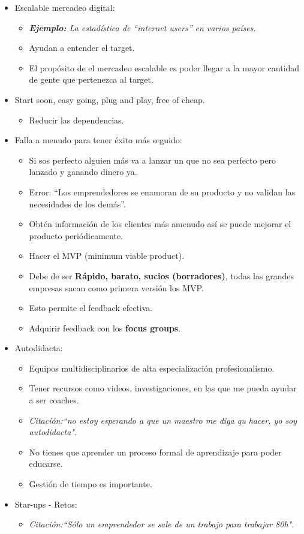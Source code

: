 \begin{itemize}
    \item Escalable mercadeo digital:
        \begin{itemize}
            \item \emph{\textbf{Ejemplo: }La estadística de ``internet users'' en varios países. } 
            \item Ayudan a entender el target.
            \item El propósito de el mercadeo escalable es poder llegar a la mayor cantidad de gente que pertenezca al target.
        \end{itemize}
    
    \item Start soon, easy going, plug and play, free of cheap.
        \begin{itemize}
            \item Reducir las dependencias.
        \end{itemize}
    
    \item Falla a menudo para tener éxito más seguido:
        \begin{itemize}
            \item Si sos perfecto alguien más va a lanzar un que no sea perfecto pero lanzado y ganando dinero ya.
            \item Error: ``Los emprendedores se enamoran de su producto y no validan las necesidades de los demás''.
            \item Obtén información de los clientes más amenudo así se puede mejorar el producto periódicamente.
            \item Hacer el MVP (minimum viable product).
            \item Debe de ser \textbf{Rápido, barato, sucios (borradores)}, todas las grandes empresas sacan como primera versión los MVP.
            \item Esto permite el feedback efectiva. 
            \item Adquirir feedback con los \textbf{focus groups}.
        \end{itemize}
    
    \item Autodidacta:
        \begin{itemize}
            \item Equipos multidisciplinarios de alta especialización profesionalismo.
            \item Tener recursos como videos, investigaciones, en las que me pueda ayudar a ser coaches.
            \item \emph{Citación:``no estoy esperando a que un maestro me diga qu hacer, yo soy autodidacta"}.
            \item No tienes que aprender un proceso formal de aprendizaje para poder educarse. 
            \item Gestión de tiempo es importante.
        \end{itemize}
    
    \item Star-ups - Retos: 
        \begin{itemize}
            \item \emph{Citación:``Sólo un emprendedor se sale de un trabajo para trabajar 80h"}.
        \end{itemize}
\end{itemize}


